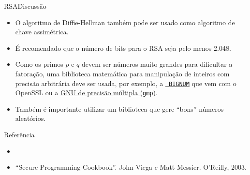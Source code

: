 \begin{frame}{RSA}{Discussão}\footnotesize

  \begin{itemize}[<+->]
  \item O algoritmo de \alert{Diffie-Hellman} também pode ser usado como 
    algoritmo de chave assimétrica.
  \item É recomendado que o número de bits para o RSA seja pelo menos 2.048.
  \item Como os primos $p$ e $q$ devem ser números muito grandes para
    dificultar a fatoração, uma biblioteca matemática para manipulação
    de inteiros com precisão arbitrária deve ser usada, por exemplo, a
    \href{https://wiki.openssl.org/index.php/Manual:Bn_internal(3)}{\tt
      BIGNUM} que vem com o OpenSSL ou a
    \href{https://gmplib.org/}{GNU de precisão múltipla ({\tt gmp})}.

\item Também é importante utilizar um biblioteca que gere ``bons'' 
  números aleatórios.
  \end{itemize}

\end{frame}

\begin{frame}{Referência}

\begin{itemize}
\item \biblioref

\item ``Secure Programming Cookbook''. John Viega e Matt
  Messier. O'Reilly, 2003.

\end{itemize}

\end{frame}
